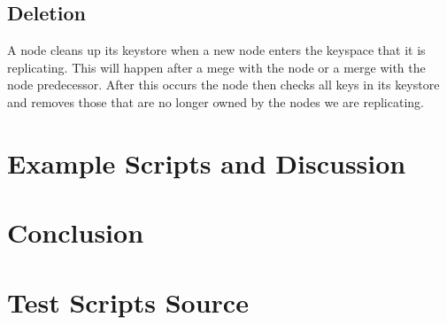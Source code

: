 \documentclass[11pt]{article}
\begin{document}
\subsection{Deletion}\label{sec:Del}

A node cleans up its keystore when a new node enters the keyspace that it is replicating. This will happen after a mege with the node or a merge with the node predecessor. After this occurs the node then checks all keys in its keystore and removes those that are no longer owned by the nodes we are replicating.

\section{Example Scripts and Discussion}\label{sec:Ex}


\section{Conclusion}\label{sec:Conc}

\clearpage

\printbibliography

\clearpage

\appendix

\section{Test Scripts Source}
\end{document}
